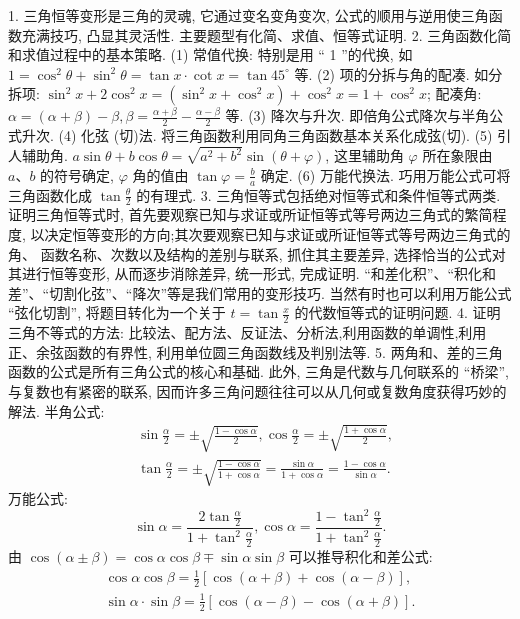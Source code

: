 
1. 三角恒等变形是三角的灵魂, 它通过变名变角变次, 公式的顺用与逆用使三角函数充满技巧, 凸显其灵活性.
主要题型有化简、求值、恒等式证明.
2. 三角函数化简和求值过程中的基本策略.
(1) 常值代换: 特别是用 “ 1 ”的代换, 如 $1=\cos ^2 \theta+\sin ^2 \theta=\tan x \cdot \cot x= \tan 45^{\circ}$ 等.
(2) 项的分拆与角的配凑.
如分拆项: $\sin ^2 x+2 \cos ^2 x=\left(\sin ^2 x+\cos ^2 x\right)+ \cos ^2 x=1+\cos ^2 x$; 配凑角: $\alpha=(\alpha+\beta)-\beta, \beta=\frac{\alpha+\beta}{2}-\frac{\alpha-\beta}{2}$ 等.
(3) 降次与升次.
即倍角公式降次与半角公式升次.
(4) 化弦 (切)法.
将三角函数利用同角三角函数基本关系化成弦(切).
(5) 引人辅助角.
$a \sin \theta+b \cos \theta=\sqrt{a^2+b^2} \sin (\theta+\varphi)$, 这里辅助角 $\varphi$ 所在象限由 $a 、 b$ 的符号确定, $\varphi$ 角的值由 $\tan \varphi=\frac{b}{a}$ 确定.
(6) 万能代换法.
巧用万能公式可将三角函数化成 $\tan \frac{\theta}{2}$ 的有理式.
3. 三角恒等式包括绝对恒等式和条件恒等式两类.
证明三角恒等式时, 首先要观察已知与求证或所证恒等式等号两边三角式的繁简程度, 以决定恒等变形的方向;其次要观察已知与求证或所证恒等式等号两边三角式的角、 函数名称、次数以及结构的差别与联系, 抓住其主要差异, 选择恰当的公式对其进行恒等变形, 从而逐步消除差异, 统一形式, 完成证明.
“和差化积”、“积化和差”、“切割化弦”、“降次”等是我们常用的变形技巧.
当然有时也可以利用万能公式 “弦化切割”, 将题目转化为一个关于 $t=\tan \frac{x}{2}$ 的代数恒等式的证明问题.
4. 证明三角不等式的方法: 比较法、配方法、反证法、分析法,利用函数的单调性,利用正、余弦函数的有界性, 利用单位圆三角函数线及判别法等.
5. 两角和、差的三角函数的公式是所有三角公式的核心和基础.
此外, 三角是代数与几何联系的 “桥梁”, 与复数也有紧密的联系, 因而许多三角问题往往可以从几何或复数角度获得巧妙的解法.
半角公式:
$$
\begin{aligned}
& \sin \frac{\alpha}{2}= \pm \sqrt{\frac{1-\cos \alpha}{2}}, \cos \frac{\alpha}{2}= \pm \sqrt{\frac{1+\cos \alpha}{2}}, \\
& \tan \frac{\alpha}{2}= \pm \sqrt{\frac{1-\cos \alpha}{1+\cos \alpha}}=\frac{\sin \alpha}{1+\cos \alpha}=\frac{1-\cos \alpha}{\sin \alpha} .
\end{aligned}
$$
万能公式:
$$
\sin \alpha=\frac{2 \tan \frac{\alpha}{2}}{1+\tan ^2 \frac{\alpha}{2}}, \cos \alpha=\frac{1-\tan ^2 \frac{\alpha}{2}}{1+\tan ^2 \frac{\alpha}{2}} .
$$
由 $\cos (\alpha \pm \beta)=\cos \alpha \cos \beta \mp \sin \alpha \sin \beta$ 可以推导积化和差公式:
$$
\begin{gathered}
\cos \alpha \cos \beta=\frac{1}{2}[\cos (\alpha+\beta)+\cos (\alpha-\beta)], \\
\sin \alpha \cdot \sin \beta=\frac{1}{2}[\cos (\alpha-\beta)-\cos (\alpha+\beta)] .
\end{gathered}
$$
